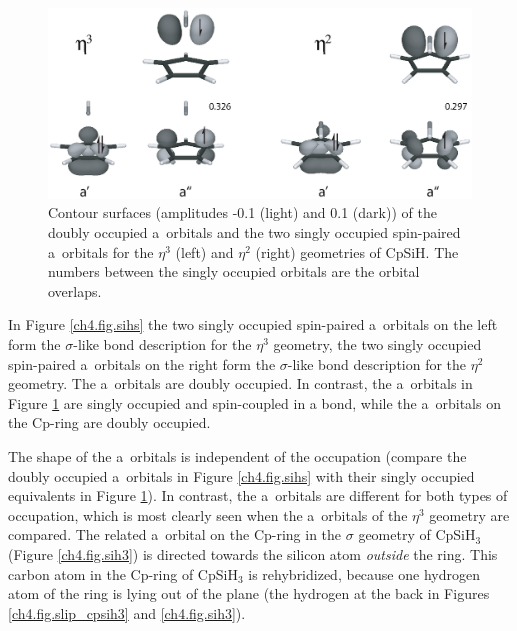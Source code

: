 \begin{figure} [htbp]
\begin{center}
\includegraphics[scale=0.67]{cyclopentadienyl/figures/sih_pi.eps}
\end{center}
\caption{Contour surfaces (amplitudes -0.1 (light) and 0.1 (dark)) of the doubly occupied a\textquotesingle\ orbitals and the two singly occupied spin-paired a\textquotesingle\textquotesingle\ orbitals for the $\eta^{3}$ (left) and $\eta^{2}$ (right) geometries of CpSiH. The numbers between the singly occupied orbitals are the orbital overlaps.}
\label{ch4.fig.sihp}
\end{figure}

In Figure \ref{ch4.fig.sihs} the two singly occupied spin-paired a\textquotesingle\ orbitals on the left form the $\sigma$-like bond description for the $\eta^3$ geometry, the two singly occupied spin-paired a\textquotesingle\ orbitals on the right form the $\sigma$-like bond description for the $\eta^2$ geometry. The a\textquotesingle\textquotesingle\ orbitals are doubly occupied. In contrast, the a\textquotesingle\textquotesingle\ orbitals in Figure \ref{ch4.fig.sihp} are singly occupied and spin-coupled in a bond, while the a\textquotesingle\ orbitals on the Cp-ring are doubly occupied.

The shape of the a\textquotesingle\textquotesingle\ orbitals is independent of the occupation (compare the doubly occupied a\textquotesingle\textquotesingle\ orbitals in Figure \ref{ch4.fig.sihs} with their  singly occupied equivalents in Figure \ref{ch4.fig.sihp}). In contrast, the a\textquotesingle\ orbitals are different for both types of occupation, which is most clearly seen when the a\textquotesingle\ orbitals of the $\eta^3$ geometry are compared. The related a\textquotesingle\ orbital on the Cp-ring in the $\sigma$ geometry of CpSiH$_3$ (Figure \ref{ch4.fig.sih3}) is directed towards the silicon atom \textit{outside} the ring. This carbon atom in the Cp-ring of CpSiH$_3$ is rehybridized, because one hydrogen atom of the ring is lying out of the plane (the hydrogen at the back in Figures \ref{ch4.fig.slip_cpsih3} and \ref{ch4.fig.sih3}).

